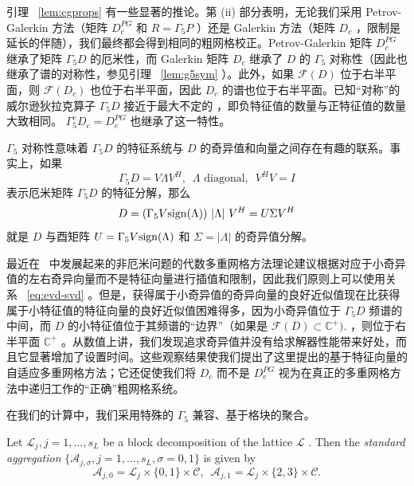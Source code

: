 \documentclass{siamltex}
\newcommand{\sign}{{\rm sign}}
\begin{document}
引理~    \ref{lem:cgprops}    有一些显著的推论。第 (ii) 部分表明，无论我们采用 Petrov-Galerkin 方法（矩阵    $D_c^{PG}$    和    $R = \Gamma_5P$    ）还是 Galerkin 方法（矩阵    $D_c$    ，限制是延长的伴随），我们最终都会得到相同的粗网格校正。Petrov-Galerkin 矩阵    $D_c^{PG}$    继承了矩阵    $\Gamma_5D$    的厄米性，而 Galerkin 矩阵    $D_c$    继承了    $D$    的    $\Gamma_5$    对称性（因此也继承了谱的对称性，参见引理~    \ref{lem:g5sym}    ）。此外，如果    $\mathcal{F}(D)$    位于右半平面，则    $\mathcal{F}(D_c)$    也位于右半平面，因此    $D_c$    的谱也位于右半平面。已知“对称”的威尔逊狄拉克算子    $\Gamma_5D$    接近于最大不定的    \cite{Gohberg_etal_2005}    ，即负特征值的数量与正特征值的数量大致相同。   $\Gamma_5^cD_c= D_c^{PG}$    也继承了这一特性。

$\Gamma_5$    对称性意味着    $\Gamma_5D$    的特征系统与    $D$    的奇异值和向量之间存在有趣的联系。事实上，如果
\[
  \Gamma_5D = V \Lambda V^H, \enspace \Lambda \mbox{ diagonal}, \enspace V^HV = I
\]    表示厄米矩阵    $\Gamma_5D$    的特征分解，那么
\begin{equation} \label{eq:evd-svd}
  D = (\Gamma_5V \sign(\Lambda))  \  |\Lambda|  \  V^H = U \Sigma V^H
\end{equation}    就是    $D$    与酉矩阵    $U = \Gamma_5 V \sign(\Lambda)$    和    $\Sigma = |\Lambda|$    的奇异值分解。

最近在~   \cite{Sanders10}    中发展起来的非厄米问题的代数多重网格方法理论建议根据对应于小奇异值的左右奇异向量而不是特征向量进行插值和限制，因此我们原则上可以使用关系~   \eqref{eq:evd-svd}    。但是，获得属于小奇异值的奇异向量的良好近似值现在比获得属于小特征值的特征向量的良好近似值困难得多，因为小奇异值位于    $\Gamma_5D$    频谱的中间，而    $D$    的小特征值位于其频谱的“边界”（如果是    $\mathcal{F}(D) \subset \mathbb{C}^+).$   ，则位于右半平面    $\mathbb{C}^+$    。从数值上讲，我们发现追求奇异值并没有给求解器性能带来好处，而且它显著增加了设置时间。这些观察结果使我们提出了这里提出的基于特征向量的自适应多重网格方法；它还促使我们将    $D_c$    而不是    $D_c^{PG}$    视为在真正的多重网格方法中递归工作的“正确”粗网格系统。

在我们的计算中，我们采用特殊的    $\Gamma_5$    兼容、基于格块的聚合。

\begin{definition} \label{def:standard_aggregation} Let         $\mathcal{L}_j,j=1,\ldots,s_L$         be a block decomposition of the lattice         $\mathcal{L}$        . Then the {\em standard aggregation}         $ \{ \mathcal{A}_{j,\sigma}, j=1,\ldots,s_L, \sigma = 0,1 \} $         is given by
  \[
    \mathcal{A}_{j,0} = \mathcal{L}_j \times  \{ 0,1 \}  \times \mathcal{C}, \enspace \mathcal{A}_{j,1} = \mathcal{L}_j \times  \{ 2,3 \}  \times \mathcal{C}.
  \]
\end{definition}
\end{document}
